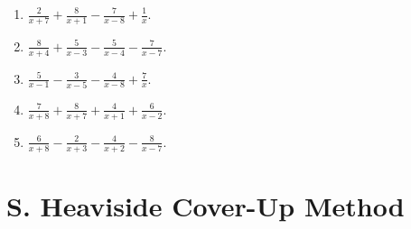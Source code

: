 \documentclass[11pt,oneside]{book}
\begin{document}
\begin{enumerate}[leftmargin=*,label=\textbf{R\arabic*.},itemsep=0.45\baselineskip]
\item $\displaystyle \frac{2}{x + 7} + \frac{8}{x + 1} - \frac{7}{x - 8} + \frac{1}{x}$.
\item $\displaystyle \frac{8}{x + 4} + \frac{5}{x - 3} - \frac{5}{x - 4} - \frac{7}{x - 7}$.
\item $\displaystyle \frac{5}{x - 1} - \frac{3}{x - 5} - \frac{4}{x - 8} + \frac{7}{x}$.
\item $\displaystyle \frac{7}{x + 8} + \frac{8}{x + 7} + \frac{4}{x + 1} + \frac{6}{x - 2}$.
\item $\displaystyle \frac{6}{x + 8} - \frac{2}{x + 3} - \frac{4}{x + 2} - \frac{8}{x - 7}$.
\end{enumerate}
\section*{S. Heaviside Cover-Up Method}
\end{document}

